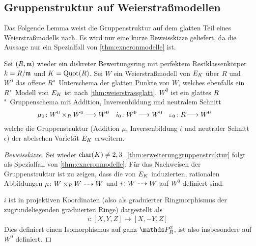 \subsection{Gruppenstruktur auf Weierstraßmodellen}
Das Folgende Lemma weist die Gruppenstruktur auf dem glatten Teil
eines Weierstraßmodells nach. Es wird nur eine kurze Beweisskizze
geliefert, da die Aussage nur ein Spezialfall von
\ref{thm:exneronmodelle} ist.
\begin{Lemma}\label{thm:erweiterunggruppenstruktur}
  Sei $(R,\mathfrak{m})$ wieder ein diskreter Bewertungsring
  mit perfektem Restklassenkörper ${k=R/\mathfrak{m}}$ und
  ${K=\operatorname{Quot}(R)}$.
  Sei $W$ ein Weierstraßmodell von $E_{K}$ über $R$ und
  $W^0$ das offene $R$"~Unterschema der glatten Punkte von $W$,
  welches ebenfalls ein $R$"~Modell von $E_{K}$ ist nach
  \ref{thm:weierstrassglatt}. 
  $W^0$ ist ein glattes $R$"~Gruppenschema
  mit Addition, Inversenbildung und neutralem Schnitt
  \begin{align*}
    \mu_0\colon W^0\times_R W^0 &\longrightarrow W^0
    &i_0\colon W^0&\longrightarrow W^0
    &\varepsilon_0\colon R&\longrightarrow W^0
  \end{align*}
  welche die Gruppenstruktur (Addition $\mu$, Inversenbildung $i$ und
  neutraler Schnitt $\epsilon$)
  der abelschen Varietät $E_{K}$ erweitern.

  
  \begin{proof}[Beweisskizze] Sei wieder $\operatorname{char}(K)\neq 2,3$.
    \ref{thm:erweiterunggruppenstruktur} folgt als Spezialfall von
    \ref{thm:exneronmodelle}.
    Für das Nachweisen der Gruppenstruktur ist zu zeigen, dass die von
    $E_{K}$ induzierten, rationalen Abbildungen $\mu\colon W\times_R
    W\dashrightarrow W$ und $i\colon W\dashrightarrow W$ auf $W^0$ definiert sind.

    $i$ ist in projektiven Koordinaten (also als graduierter
    Ringmorphismus der zugrundeliegenden graduierten Ringe)
    dargestellt als
    \begin{gather*}
      i\colon [X,Y,Z]\mapsto [X,-Y,Z]
    \end{gather*}
    Dies definiert einen Isomorphismus auf ganz $\P_R^2$, ist also
    insbesondere auf $W^0$ definiert.


\end{proof}
\end{Lemma}
